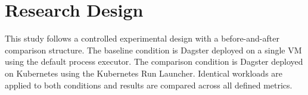 
\section{Research Design}
\label{sec:research-design}

This study follows a controlled experimental design with a before-and-after comparison structure. The baseline condition is Dagster deployed on a single VM using the default process executor. The comparison condition is Dagster deployed on Kubernetes using the Kubernetes Run Launcher. Identical workloads are applied to both conditions and results are compared across all defined metrics.
